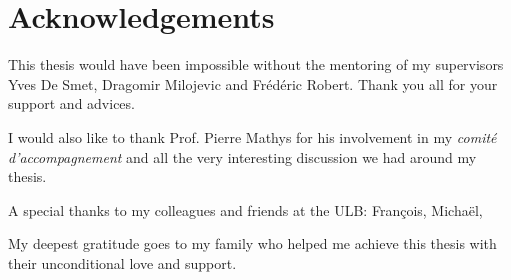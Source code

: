 \chapter{Acknowledgements}

This thesis would have been impossible without the mentoring of my supervisors Yves De Smet, Dragomir Milojevic and Frédéric Robert. Thank you all for your support and advices.

I would also like to thank Prof. Pierre Mathys for his involvement in my \textit{comité d'accompagnement} and all the very interesting discussion we had around my thesis.

A special thanks to my colleagues and friends at the ULB: François, Michaël, 

My deepest gratitude goes to my family who helped me achieve this thesis with their unconditional love and support.

